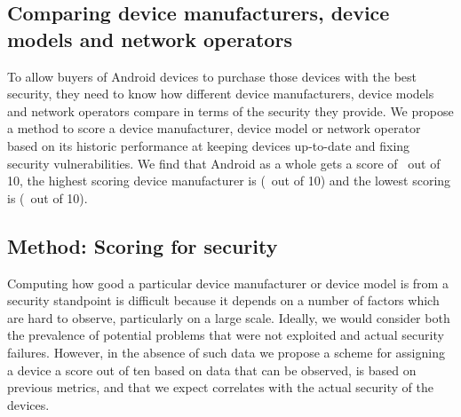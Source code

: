\subsection{Comparing device manufacturers, device models and network operators}
\label{sec:security_scoring}\label{sec:exp:security_score}

To allow buyers of Android devices to purchase those devices with the best security, they need to know how different device manufacturers, device models and network operators compare in terms of the security they provide.
We propose a method to score a device manufacturer, device model or network operator based on its historic performance at keeping devices up-to-date and fixing security vulnerabilities.
We find that Android as a whole gets a score of \daSecurityScore\ out of 10, the highest scoring device manufacturer is \emph{\daSecScoreBestmanufacturer} (\daSecScoreBestmanufacturerScore\ out of 10) and the lowest scoring is \emph{\daSecScoreWorstmanufacturer} (\daSecScoreWorstmanufacturerScore\ out of 10).

\subsection{Method: Scoring for security}\label{sec:security_scoring:method}

Computing how good a particular device manufacturer or device model is from a security standpoint is difficult because it depends on a number of factors which are hard to observe, particularly on a large scale.
Ideally, we would consider both the prevalence of potential problems that were not exploited and actual security failures.
However, in the absence of such data we propose a scheme for assigning a device a score out of ten based on data that can be observed, is based on previous metrics, and that we expect correlates with the actual security of the devices.

